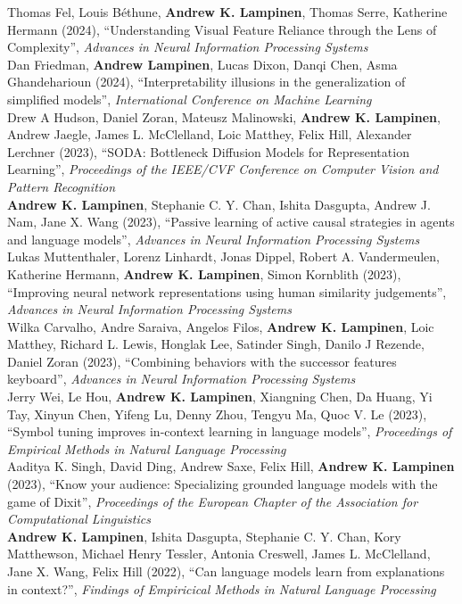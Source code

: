 \documentclass[margin]{res}
\begin{document}
\begin{resume}
Thomas Fel, Louis B{\'e}thune, \textbf{Andrew K. Lampinen}, Thomas Serre,  Katherine Hermann (2024), {``Understanding Visual Feature Reliance through the Lens of Complexity'',} \textit{Advances in Neural Information Processing Systems} \\[5pt]
Dan Friedman, \textbf{Andrew Lampinen}, Lucas Dixon, Danqi Chen, Asma Ghandeharioun (2024), {``Interpretability illusions in the generalization of simplified models'',} \textit{International Conference on Machine Learning} \\[5pt]
Drew A Hudson, Daniel Zoran, Mateusz Malinowski, \textbf{Andrew K. Lampinen}, Andrew Jaegle, James L. McClelland, Loic Matthey, Felix Hill, Alexander Lerchner (2023), {``SODA: Bottleneck Diffusion Models for Representation Learning''}, \textit{Proceedings of the IEEE/CVF Conference on Computer Vision and Pattern Recognition} \\[5pt]
\textbf{Andrew K. Lampinen}, Stephanie C. Y. Chan, Ishita Dasgupta, Andrew J. Nam, Jane X. Wang (2023), {``Passive learning of active causal strategies in agents and language models'',} \textit{Advances in Neural Information Processing Systems} \\[5pt]
Lukas Muttenthaler, Lorenz Linhardt, Jonas Dippel, Robert A. Vandermeulen, Katherine Hermann, \textbf{Andrew K. Lampinen}, Simon Kornblith (2023), {``Improving neural network representations using human similarity judgements'',} \textit{Advances in Neural Information Processing Systems} \\[5pt]
Wilka Carvalho, Andre Saraiva, Angelos Filos, \textbf{Andrew K. Lampinen}, Loic Matthey, Richard L. Lewis, Honglak Lee, Satinder Singh, Danilo J Rezende, Daniel Zoran (2023), {``Combining behaviors with the successor features keyboard''}, \textit{Advances in Neural Information Processing Systems} \\[5pt]
Jerry Wei, Le Hou, \textbf{Andrew K. Lampinen}, Xiangning Chen, Da Huang, Yi Tay, Xinyun Chen, Yifeng Lu, Denny Zhou, Tengyu Ma, Quoc V. Le (2023), {``Symbol tuning improves in-context learning in language models'',} \textit{Proceedings of Empirical Methods in Natural Language Processing} \\[5pt]
Aaditya K. Singh, David Ding, Andrew Saxe, Felix Hill, \textbf{Andrew K. Lampinen} (2023), {``Know your audience: Specializing grounded language models with the game of Dixit'',} \textit{Proceedings of the European Chapter of the Association for Computational Linguistics} \\[5pt]
\textbf{Andrew K. Lampinen}, Ishita Dasgupta, Stephanie C. Y. Chan, Kory Matthewson, Michael Henry Tessler, Antonia Creswell, James L. McClelland, Jane X. Wang, Felix Hill (2022), {``Can language models learn from explanations in context?'',} \textit{Findings of Empiricical Methods in Natural Language Processing} \\[5pt] 

\end{resume}
\end{document}
